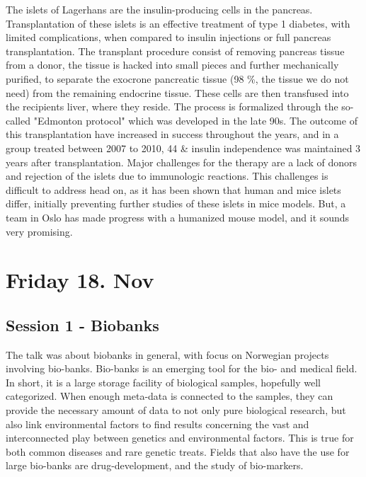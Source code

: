 \documentclass[12p]{article}
\begin{document}
The islets of Lagerhans are the insulin-producing cells in the pancreas.
Transplantation of these islets is an effective treatment of type 1 diabetes, with limited complications, when compared to insulin injections or full pancreas transplantation.
The transplant procedure consist of removing pancreas tissue from a donor, the tissue is hacked into small pieces and further mechanically purified, to separate the exocrone pancreatic tissue (98 \%, the tissue we do not need) from the remaining endocrine tissue.
These cells are then transfused into the recipients liver, where they reside.
The process is formalized through the so-called "Edmonton protocol" which was developed in the late 90s.
The outcome of this transplantation have increased in success throughout the years, and in a group treated between 2007 to 2010, 44 \& insulin independence was maintained 3 years after transplantation.
Major challenges for the therapy are a lack of donors and rejection of the islets due to immunologic reactions.
This challenges is difficult to address head on, as it has been shown that human and mice islets differ, initially preventing further studies of these islets in mice models.
But, a team in Oslo has made progress with a humanized mouse model, and it sounds very promising. 


\section*{Friday 18. Nov}

\subsection*{Session 1 - Biobanks}

The talk was about biobanks in general, with focus on Norwegian projects involving bio-banks.
Bio-banks is an emerging tool for the bio- and medical field.
In short, it is a large storage facility of biological samples, hopefully well categorized.
When enough meta-data is connected to the samples, they can provide the necessary amount of data to not only pure biological research, but also link environmental factors to find results concerning the vast and interconnected play between genetics and environmental factors.
This is true for both common diseases and rare genetic treats.
Fields that also have the use for large bio-banks are drug-development, and the study of bio-markers.
\end{document}
